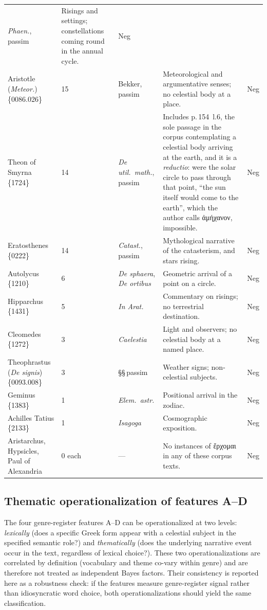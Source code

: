 \documentclass[11pt,a4paper]{article}
\newcommand{\grk}[1]{{\fontencoding{LGR}\selectfont #1}}
\newcommand{\grk}[1]{{\greekfont #1}}
\begin{document}
\begin{longtable}{@{}p{3.2cm}p{1.0cm}p{4.2cm}p{4.2cm}p{0.7cm}@{}}
  \textit{Phaen.}, passim &
  Risings and settings; constellations coming round in the annual cycle. & Neg \\[3pt]
Aristotle (\textit{Meteor.}) \{0086.026\} & 15 &
  Bekker, passim &
  Meteorological and argumentative senses; no celestial body at a place. & Neg \\[3pt]
Theon of Smyrna \{1724\} & 14 &
  \textit{De util.\ math.}, passim &
  Includes p.\,154~l.6, the sole passage in the corpus contemplating a
  celestial body arriving at the earth, and it is a \emph{reductio}:
  were the solar circle to pass through that point, ``the sun itself would
  come to the earth'', which the author calls \grk{ἀμήχανον}, impossible. & Neg \\[3pt]
Eratosthenes \{0222\} & 14 &
  \textit{Catast.}, passim &
  Mythological narrative of the catasterism, and stars rising. & Neg \\[3pt]
Autolycus \{1210\} & 6 &
  \textit{De sphaera}, \textit{De ortibus} &
  Geometric arrival of a point on a circle. & Neg \\[3pt]
Hipparchus \{1431\} & 5 &
  \textit{In Arat.} &
  Commentary on risings; no terrestrial destination. & Neg \\[3pt]
Cleomedes \{1272\} & 3 &
  \textit{Caelestia} &
  Light and observers; no celestial body at a named place. & Neg \\[3pt]
Theophrastus (\textit{De signis}) \{0093.008\} & 3 &
  §§\,passim &
  Weather signs; non-celestial subjects. & Neg \\[3pt]
Geminus \{1383\} & 1 &
  \textit{Elem.\ astr.} &
  Positional arrival in the zodiac. & Neg \\[3pt]
Achilles Tatius \{2133\} & 1 &
  \textit{Isagoga} &
  Cosmographic exposition. & Neg \\[3pt]
Aristarchus, Hypsicles,
  Paul of Alexandria & 0 each &
  --- & No instances of \grk{ἔρχομαι} in any of these corpus texts. & Neg \\[3pt]

\end{longtable}

\subsection{Thematic operationalization of features A--D}
\label{subsec:thematic}

The four genre-register features A--D can be operationalized at two levels:
\emph{lexically} (does a specific Greek form appear with a celestial subject
in the specified semantic role?) and \emph{thematically} (does the underlying
narrative event occur in the text, regardless of lexical choice?). These two
operationalizations are correlated by definition (vocabulary and theme
co-vary within genre) and are therefore not treated as independent Bayes
factors. Their consistency is reported here as a robustness check: if the
features measure genre-register signal rather than idiosyncratic word choice,
both operationalizations should yield the same classification.
\end{document}
